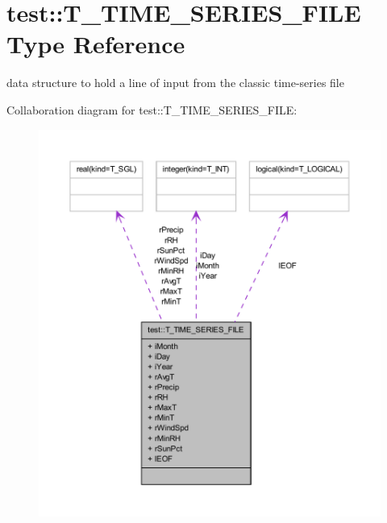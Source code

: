 \hypertarget{typetest_1_1_t___t_i_m_e___s_e_r_i_e_s___f_i_l_e}{
\section{test::T\_\-TIME\_\-SERIES\_\-FILE Type Reference}
\label{typetest_1_1_t___t_i_m_e___s_e_r_i_e_s___f_i_l_e}
}


data structure to hold a line of input from the classic time-\/series file  




Collaboration diagram for test::T\_\-TIME\_\-SERIES\_\-FILE:\nopagebreak
\begin{figure}[H]
\begin{center}
\leavevmode
\includegraphics[width=400pt]{typetest_1_1_t___t_i_m_e___s_e_r_i_e_s___f_i_l_e__coll__graph}
\end{center}
\end{figure}
